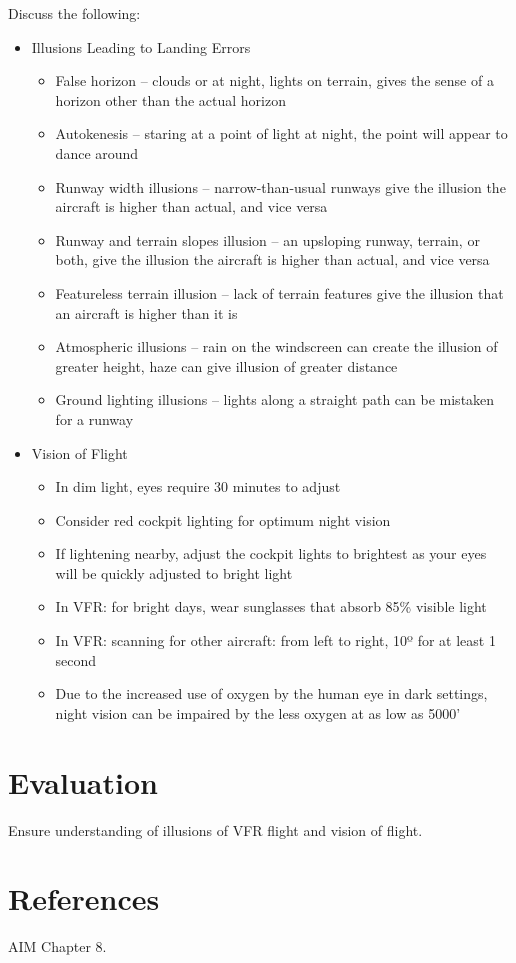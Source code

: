 Discuss the following:
\begin{itemize}
  \item Illusions Leading to Landing Errors
    \begin{itemize}
      \item False horizon -- clouds or at night, lights on terrain, gives the
        sense of a horizon other than the actual horizon
      \item Autokenesis -- staring at a point of light at night, the point will
        appear to dance around
      \item Runway width illusions -- narrow-than-usual runways give the
        illusion the aircraft is higher than actual, and vice versa
      \item Runway and terrain slopes illusion -- an upsloping runway, terrain,
        or both, give the illusion the aircraft is higher than actual, and vice
        versa
      \item Featureless terrain illusion -- lack of terrain features give the
        illusion that an aircraft is higher than it is
      \item Atmospheric illusions -- rain on the windscreen can create the
        illusion of greater height, haze can give illusion of greater distance
      \item Ground lighting illusions -- lights along a straight path can be
        mistaken for a runway
    \end{itemize}
  \item Vision of Flight
    \begin{itemize}
      \item In dim light, eyes require 30 minutes to adjust
      \item Consider red cockpit lighting for optimum night vision
      \item If lightening nearby, adjust the cockpit lights to brightest as
        your eyes will be quickly adjusted to bright light
      \item In VFR: for bright days, wear sunglasses that absorb 85\% visible
        light
      \item In VFR: scanning for other aircraft: from left to right, 10º for at
        least 1 second
      \item Due to the increased use of oxygen by the human eye in dark
        settings, night vision can be impaired by the less oxygen at as low as
        5000'
    \end{itemize}
\end{itemize}

\section{Evaluation}

Ensure understanding of illusions of VFR flight and vision of flight.

\section{References}

AIM Chapter 8.

